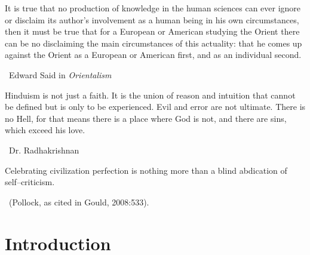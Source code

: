 \begin{myquote}
It is true that no production of knowledge in the human sciences can ever ignore or disclaim its author’s involvement as a human being in his own circumstances, then it must be true that for a European or American studying the Orient there can be no disclaiming the main circumstances of this actuality: that he comes up against the Orient as a European or American first, and as an individual second. 

~\hfill Edward Said in \textit{Orientalism}
\end{myquote}

\begin{myquote}
Hinduism is not just a faith. It is the union of reason and intuition that cannot be defined but is only to be experienced. Evil and error are not ultimate. There is no Hell, for that means there is a place where God is not, and there are sins, which exceed his love. 

~\hfill Dr. Radhakrishnan
\end{myquote}

\begin{myquote}
Celebrating civilization perfection is nothing more than a blind abdication of self–criticism. 

~\hfill (Pollock, as cited in Gould, 2008:533).
\end{myquote}


\section*{Introduction}

